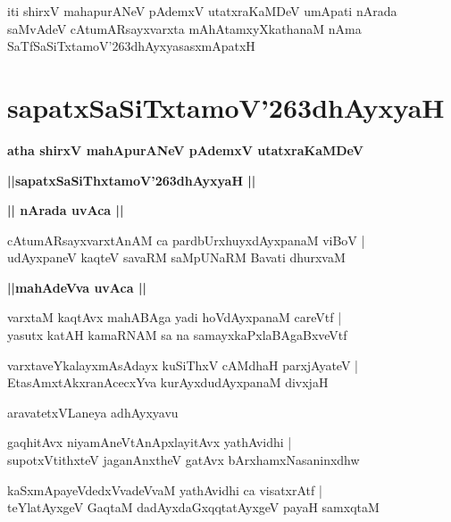 \documentclass[twoside,12pt,openright]{book}
\def\S{\char'263}
\newcounter{shloka}[chapter]
\def\uvaca#1{\centerline{{\large\textbf{#1}}}}
\begin{document}
\begin{center}
iti shirxV mahapurANeV pAdemxV utatxraKaMDeV umApati nArada saMvAdeV cAtumARsayxvarxta 
mAhAtamxyXkathanaM nAma SaTfSaSiTxtamoV\S dhAyxyasasxmApatxH
\end{center}

\chapter{sapatxSaSiTxtamoV\S dhAyxyaH}

\begin{center}
{\LARGE\bfseries atha shirxV mahApurANeV pAdemxV utatxraKaMDeV}
\end{center}

\begin{center}
{\LARGE\bfseries ||sapatxSaSiThxtamoV\S dhAyxyaH || }
\end{center}

\uvaca{|| nArada uvAca ||}

\begin{shloka}%
cAtumARsayxvarxtAnAM ca pardbUrxhuyxdAyxpanaM viBoV |\\
udAyxpaneV kaqteV savaRM saMpUNaRM Bavati dhurxvaM 
\end{shloka}

\uvaca{||mahAdeVva uvAca ||}

\begin{shloka}%
varxtaM kaqtAvx mahABAga yadi hoVdAyxpanaM careVtf |\\
yasutx katAH kamaRNAM sa na samayxkaPxlaBAgaBxveVtf
\end{shloka}

\begin{shloka}%
varxtaveYkalayxmAsAdayx kuSiThxV cAMdhaH parxjAyateV |\\
EtasAmxtAkxranAcecxYva kurAyxdudAyxpanaM divxjaH 
\end{shloka}

\begin{center}
aravatetxVLaneya adhAyxyavu
\end{center}

\begin{shloka}%
gaqhitAvx niyamAneVtAnApxlayitAvx yathAvidhi |\\
supotxVtithxteV jaganAnxtheV gatAvx bArxhamxNasaninxdhw 
\end{shloka}

\begin{shloka}%
kaSxmApayeVdedxVvadeVvaM yathAvidhi ca visatxrAtf |\\
teYlatAyxgeV GaqtaM dadAyxdaGxqqtatAyxgeV payaH samxqtaM 
\end{shloka}
\end{document}
